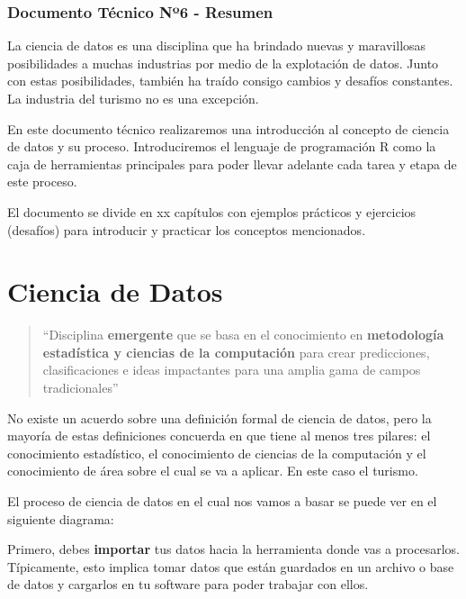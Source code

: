 \documentclass[
  openany]{book}
\begin{document}
\hypertarget{documento-tuxe9cnico-nuxba6---resumen}{%
\subsection*{Documento Técnico Nº6 - Resumen}\label{documento-tuxe9cnico-nuxba6---resumen}}

La ciencia de datos es una disciplina que ha brindado nuevas y maravillosas posibilidades a muchas industrias por medio de la explotación de datos. Junto con estas posibilidades, también ha traído consigo cambios y desafíos constantes. La industria del turismo no es una excepción.

En este documento técnico realizaremos una introducción al concepto de ciencia de datos y su proceso. Introduciremos el lenguaje de programación R como la caja de herramientas principales para poder llevar adelante cada tarea y etapa de este proceso.

El documento se divide en xx capítulos con ejemplos prácticos y ejercicios (desafíos) para introducir y practicar los conceptos mencionados.

\hypertarget{ciencia-de-datos}{%
\chapter{Ciencia de Datos}\label{ciencia-de-datos}}

\begin{quote}
``Disciplina \textbf{emergente} que se basa en el conocimiento en \textbf{metodología estadística y ciencias de la computación} para crear predicciones, clasificaciones e ideas impactantes para una amplia gama de campos tradicionales''
\end{quote}

No existe un acuerdo sobre una definición formal de ciencia de datos, pero la mayoría de estas definiciones concuerda en que tiene al menos tres pilares: el conocimiento estadístico, el conocimiento de ciencias de la computación y el conocimiento de área sobre el cual se va a aplicar.
En este caso el turismo.

El proceso de ciencia de datos en el cual nos vamos a basar se puede ver en el siguiente diagrama:

Primero, debes \textbf{importar} tus datos hacia la herramienta donde vas a procesarlos.
Típicamente, esto implica tomar datos que están guardados en un archivo o base de datos y cargarlos en tu software para poder trabajar con ellos.
\end{document}
